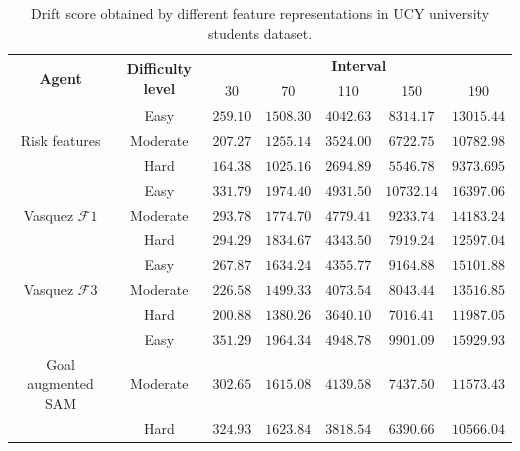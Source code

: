 \begin{table}[htbp]
	\begin{center}
		\renewcommand{\arraystretch}{1.3}
		\begin{tabular}{|c|c|c|c|c|c|c|}
			\hline
			\multicolumn{1}{|c|}{\multirow{2}{*}{\textbf{Agent}}} & \multicolumn{1}{c|}{\multirow{2}{*}{\textbf{Difficulty level}}}  & \multicolumn{5}{c|}{\multirow{1}{*}{\textbf{Interval}}}\\ \cline{3-7}
			
			&& 30 & 70 & 110 & 150  &  190 \\
			\hline
								& Easy & $259.10$ & $1508.30$ & $4042.63$ & $8314.17$ & $13015.44$ \\ \cline{2-7}
			Risk features & Moderate & $207.27$ & $1255.14$ & $3524.00$ & $6722.75$ & $10782.98$ \\ \cline{2-7}
								& Hard & $164.38$ & $1025.16$ & $2694.89$ & $5546.78$ & $9373.695$ \\
			\hline
											& Easy & $331.79$ & $1974.40$ & $4931.50$ & $10732.14$ & $16397.06$ \\ \cline{2-7}
			Vasquez $\mathcal{F}1$ & Moderate & $293.78$ & $1774.70$ & $4779.41$ & $9233.74$ & $14183.24$ \\ \cline{2-7}
											& Hard & $294.29$ & $1834.67$ & $4343.50$ & $7919.24$ & $12597.04$ \\
			\hline
			 								& Easy & $267.87$ & $1634.24$ & $4355.77$ & $9164.88$ & $15101.88$ \\ \cline{2-7}
			Vasquez $\mathcal{F}3$ & Moderate & $226.58$ & $1499.33$ & $4073.54$ & $8043.44$ & $13516.85$ \\ \cline{2-7}
											& Hard & $200.88$ & $1380.26$ & $3640.10$ & $7016.41$ & $11987.05$ \\
			\hline			
		 							 	& Easy & $351.29$ & $1964.34$ & $4948.78$ & $9901.09$ & $15929.93$ \\ \cline{2-7}
			Goal augmented SAM & Moderate & $302.65$ & $1615.08$ & $4139.58$ & $7437.50$ & $11573.43$ \\ \cline{2-7}
										& Hard & $324.93$ & $1623.84$ & $3818.54$ & $6390.66$ & $10566.04$ \\
			\hline
		\end{tabular}
	\end{center}
	\caption{Drift score obtained by different feature representations in UCY university students dataset.}
	\label{tab:ucy_inter_irl_drift_results}
\end{table}


